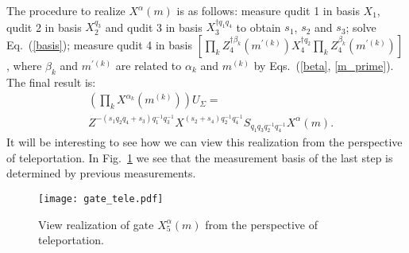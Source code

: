 \documentclass[aps,amsfonts,pra,twocolumn,showpacs]{revtex4-1}
\begin{document}
	The procedure to realize $X^\alpha(m)$ is as follows: measure qudit 1 in basis $X_1$, qudit 2 in basis $X_2^{q_3}$ and qudit 3 in basis $X_3^{\dagger q_1q_4}$ to obtain $s_1$, $s_2$ and $s_3$; solve Eq.~(\ref{basis}); measure qudit 4 in basis $[\prod_kZ_4^{\dagger\beta_k}(m^{\prime(k)}) X_4^{\dagger q_2} \prod_kZ_4^{\beta_k}(m^{\prime(k)})]$, where $\beta_k$ and $m^{\prime(k)}$ are related to $\alpha_k$ and $m^{(k)}$ by Eqs.~(\ref{beta}, \ref{m_prime}). The final result is:
		\begin{align}
		& \left( \prod_k X^{\alpha_k}(m^{(k)}) \right) U_\Sigma = \nonumber \\
			& Z^{-(s_1q_2q_4+s_3)q_1^{-1}q_3^{-1}} X^{(s_2+s_4)q_2^{-1}q_4^{-1}} S_{q_1q_3q_2^{-1}q_4^{-1}} X^\alpha(m).
		\end{align}
	It will be interesting to see how we can view this realization from the perspective of teleportation. In Fig.~\ref{tele} we see that the measurement basis of the last step is determined by previous measurements.
	
	\begin{figure}[h]
		\centering
		\texttt{[image: gate\_tele.pdf]}
		\caption{View realization of gate $X_5^\alpha(m)$ from the perspective of teleportation.}
		\label{tele}
	\end{figure}
		
\end{document}
